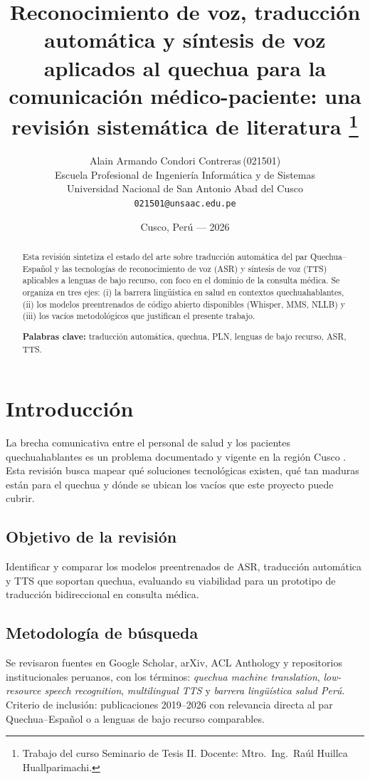 \documentclass[12pt,a4paper]{article}
\title{\vspace{-1.2cm}\bfseries Reconocimiento de voz, traducci{\'o}n autom{\'a}tica y s{\'i}ntesis de voz
aplicados al quechua para la comunicaci{\'o}n m{\'e}dico-paciente: una revisi{\'o}n sistem{\'a}tica de literatura%
\thanks{Trabajo del curso Seminario de Tesis II. Docente: Mtro.\ Ing.\ Ra{\'u}l Huillca Huallparimachi.}}
\author{Alain Armando Condori Contreras\,(021501)\\[2pt]
  \normalsize Escuela Profesional de Ingenier{\'i}a Inform{\'a}tica y de Sistemas\\[1pt]
  \normalsize Universidad Nacional de San Antonio Abad del Cusco\\[1pt]
  \normalsize \texttt{021501@unsaac.edu.pe}}
\date{Cusco, Per{\'u} --- 2026}
\begin{document}
\maketitle

\begin{abstract}
\noindent Esta revisi{\'o}n sintetiza el estado del arte sobre traducci{\'o}n autom{\'a}tica del par
Quechua--Espa{\~n}ol y las tecnolog{\'i}as de reconocimiento de voz (ASR) y s{\'i}ntesis de voz
(TTS) aplicables a lenguas de bajo recurso, con foco en el dominio de la consulta m{\'e}dica.
Se organiza en tres ejes: (i) la barrera ling{\"u}{\'i}stica en salud en contextos
quechuahablantes, (ii) los modelos preentrenados de c{\'o}digo abierto disponibles
(Whisper, MMS, NLLB) y (iii) los vac{\'i}os metodol{\'o}gicos que justifican el presente
trabajo.

\vspace{0.3cm}
\noindent\textbf{Palabras clave:} traducci{\'o}n autom{\'a}tica, quechua, PLN, lenguas de bajo recurso, ASR, TTS.
\end{abstract}

\section{Introducci{\'o}n}
La brecha comunicativa entre el personal de salud y los pacientes quechuahablantes es un
problema documentado y vigente en la regi{\'o}n Cusco \parencite{begazo2026}. Esta revisi{\'o}n
busca mapear qu{\'e} soluciones tecnol{\'o}gicas existen, qu{\'e} tan maduras est{\'a}n para el
quechua y d{\'o}nde se ubican los vac{\'i}os que este proyecto puede cubrir.

\subsection{Objetivo de la revisi{\'o}n}
Identificar y comparar los modelos preentrenados de ASR, traducci{\'o}n autom{\'a}tica y TTS
que soportan quechua, evaluando su viabilidad para un prototipo de traducci{\'o}n
bidireccional en consulta m{\'e}dica.

\subsection{Metodolog{\'i}a de b{\'u}squeda}
Se revisaron fuentes en Google Scholar, arXiv, ACL Anthology y repositorios
institucionales peruanos, con los t{\'e}rminos: \emph{quechua machine translation},
\emph{low-resource speech recognition}, \emph{multilingual TTS} y \emph{barrera
ling{\"u}{\'i}stica salud Per{\'u}}. Criterio de inclusi{\'o}n: publicaciones 2019--2026
con relevancia directa al par Quechua--Espa{\~n}ol o a lenguas de bajo recurso comparables.
\end{document}
